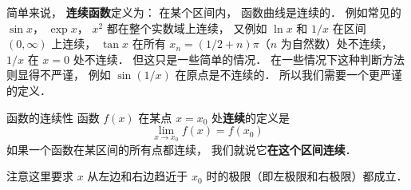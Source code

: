 

简单来说， \textbf{连续函数}定义为： 在某个区间内， 函数曲线是连续的． 例如常见的 $\sin x$， $\exp x$， $x^2$ 都在整个实数域上连续， 又例如 $\ln x$ 和 $1/x$ 在区间 $(0, \infty)$ 上连续， $\tan x$ 在所有 $x_n = (1/2 + n)\pi$（$n$ 为自然数）处不连续， $1/x$ 在 $x = 0$ 处不连续． 但这只是一些简单的情况． 在一些情况下这种判断方法则显得不严谨， 例如 $\sin(1/x)$ 在原点是不连续的． 所以我们需要一个更严谨的定义．

\begin{definition}{函数的连续性}
函数 $f(x)$ 在某点 $x = x_0$ 处\textbf{连续}的定义是
\begin{equation}
\lim_{x \to x_0} f(x) = f(x_0)
\end{equation}
如果一个函数在某区间的所有点都连续， 我们就说它\textbf{在这个区间连续}．
\end{definition}

注意这里要求 $x$ 从左边和右边趋近于 $x_0$ 时的极限（即左极限和右极限）都成立． 

